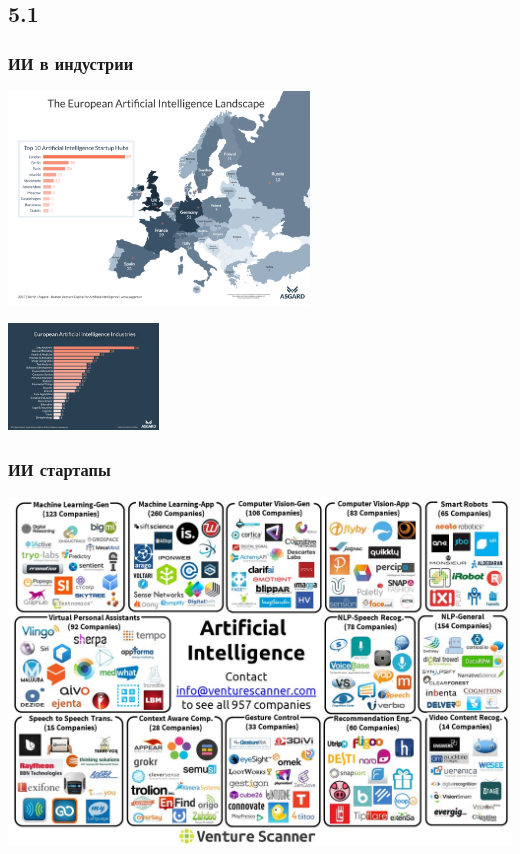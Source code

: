 \documentclass[default]{beamer}
\begin{document}
	\subsection{5.1}
	\begin{frame}
		\frametitle{ИИ в индустрии}
		\centering
		\includegraphics[width=0.6\textwidth]{asgard_1.png}
		\par\bigskip
		\includegraphics[width=0.3\textwidth]{asgard_2.png}
	\end{frame}

	\begin{frame}
		\frametitle{ИИ стартапы}
		\centering
		\includegraphics[width=\textwidth]{ai_startups.jpg}
	\end{frame}
\end{document}
